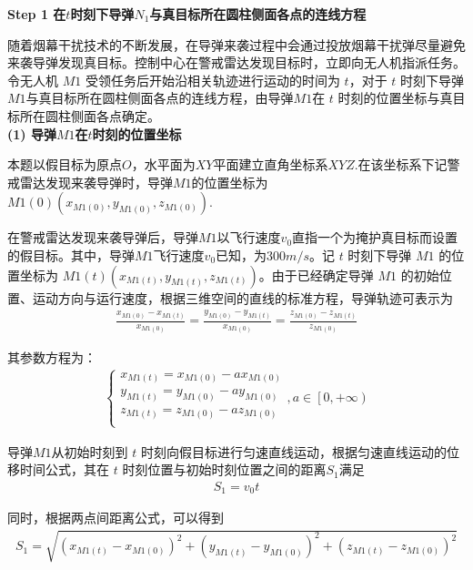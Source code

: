 \documentclass[../main.tex]{subfiles}
\begin{document}
\noindent \textbf{Step 1 在\( t \)时刻下导弹\( N_1 \)与真目标所在圆柱侧面各点的连线方程}
\par 随着烟幕干扰技术的不断发展，在导弹来袭过程中会通过投放烟幕干扰弹尽量避免来袭导弹发现真目标。控制中心在警戒雷达发现目标时，立即向无人机指派任务。令无人机 \( M1 \) 受领任务后开始沿相关轨迹进行运动的时间为 \( t \)，对于 \( t \) 时刻下导弹 \( M1 \)与真目标所在圆柱侧面各点的连线方程，由导弹$M1$在 \( t \) 时刻的位置坐标与真目标所在圆柱侧面各点确定。
\\
\textbf{(1) 导弹$M1$在\( t \)时刻的位置坐标}
\par 本题以假目标为原点$O$，水平面为$XY$平面建立直角坐标系$XYZ$.在该坐标系下记警戒雷达发现来袭导弹时，导弹$M1$的位置坐标为\( M{1(0)}(x_{M{1(0)}}, y_{M{1(0)}}, z_{M{1(0)}}) \).
\par 在警戒雷达发现来袭导弹后，导弹\( M1 \)以飞行速度\( v_0 \)直指一个为掩护真目标而设置的假目标。其中，导弹$M1$飞行速度\( v_0 \)已知，为$300m/s$。记 \( t \) 时刻下导弹 \( M1 \) 的位置坐标为 \( M1(t)(x_{M1(t)}, y_{M1(t)}, z_{M1(t)}) \)。由于已经确定导弹 \( M1 \) 的初始位置、运动方向与运行速度，根据三维空间的直线的标准方程，导弹轨迹可表示为
\begin{align}\label{1.1}
\frac{x_{M1(0)}-x_{M1(t)}}{x_{M1(0)}}=\frac{y_{M1(0)}-y_{M1(t)}}{x_{M1(0)}}=\frac{z_{M1(0)}-z_{M1(t)}}{z_{M1(0)}}
\end{align}
\par 其参数方程为：
\begin{align}\label{1.2}
\left\{ \begin{array}{l}
x_{M1(t)}=x_{M1(0)}-ax_{M1(0)}\\
y_{M1(t)}=y_{M1(0)}-ay_{M1(0)}\\
z_{M1(t)}=z_{M1(0)}-az_{M1(0)}\\
\end{array} \right. ,a\in \left[ 0,+\infty \right)
\end{align}
\par 导弹$M1$从初始时刻到 \( t \) 时刻向假目标进行匀速直线运动，根据匀速直线运动的位移时间公式，其在 $t$ 时刻位置与初始时刻位置之间的距离$S_1$满足
\begin{align}\label{1.5}
S_1 = v_0 t
\end{align}
\par 同时，根据两点间距离公式，可以得到
\begin{align}\label{1.3}
S_1 =  \sqrt{(x_{M1(t)} - x_{M1(0)})^2 + (y_{M1(t)} - y_{M1(0)})^2 + (z_{M1(t)} - z_{M1(0)})^2}
\end{align}
\end{document}
